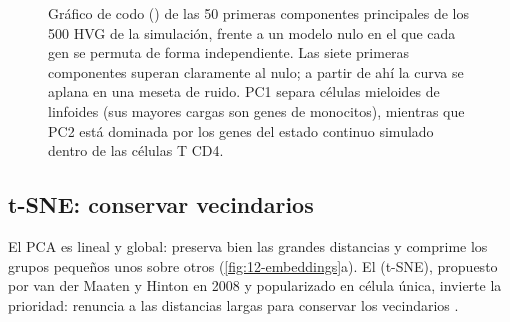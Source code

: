 \begin{figure}[t]
\centering
{}
\caption[Varianza explicada por las componentes principales]{Gráfico de codo () de las 50 primeras componentes principales de los 500 HVG de la simulación, frente a un modelo nulo en el que cada gen se permuta de forma independiente. Las siete primeras componentes superan claramente al nulo; a partir de ahí la curva se aplana en una meseta de ruido. PC1 separa células mieloides de linfoides (sus mayores cargas son genes de monocitos), mientras que PC2 está dominada por los genes del estado continuo simulado dentro de las células T CD4.}
\label{fig:12-pca}
\end{figure}

\subsection{t-SNE: conservar vecindarios}

El PCA es lineal y global: preserva bien las grandes distancias y comprime los grupos pequeños unos sobre otros (\cref{fig:12-embeddings}a). El  (t-SNE), propuesto por van der Maaten y Hinton en 2008 y popularizado en célula única, invierte la prioridad: renuncia a las distancias largas para conservar los vecindarios \parencite{c12-kobak2019}.

